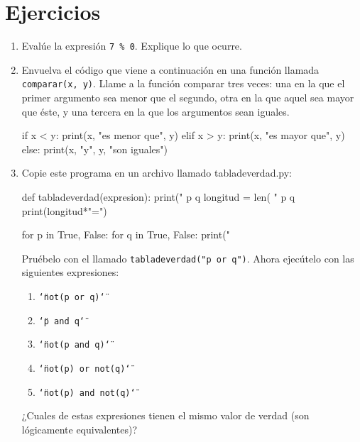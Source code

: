 \section{Ejercicios}
\begin{enumerate}
\item Evalúe la expresión \verb+7 % 0+. Explique lo que ocurre.
\item Envuelva el código que viene a continuación en una función llamada
\verb+comparar(x, y)+. Llame a la función comparar tres veces: una
en la que el primer argumento sea menor que el segundo, otra en la
que aquel sea mayor que éste, y una tercera en la que los argumentos
sean iguales. 
\begin{pythoncode}
 if x < y:
    print(x, "es menor que", y)
 elif x > y:
    print(x, "es mayor que", y)
 else:
    print(x, "y", y, "son iguales")
\end{pythoncode}
\item Copie este programa en un archivo llamado tabladeverdad.py: 
\begin{pythoncode}
def tabladeverdad(expresion):
    print(" p      q      %
    longitud = len( " p      q      %
    print(longitud*"=")

    for p in True, False:
        for q in True, False:
            print("%
\end{pythoncode}

Pruébelo con el llamado \verb+tabladeverdad("p or q")+. Ahora ejecútelo
con las siguientes expresiones: 
\begin{enumerate}
\item \texttt{\char`\"{}not(p or q)\char`\"{}} 
\item \texttt{\char`\"{}p and q\char`\"{}} 
\item \texttt{\char`\"{}not(p and q)\char`\"{}} 
\item \texttt{\char`\"{}not(p) or not(q)\char`\"{}} 
\item \texttt{\char`\"{}not(p) and not(q)\char`\"{} }
\end{enumerate}
¿Cuales de estas expresiones tienen el mismo valor de verdad (son
lógicamente equivalentes)?
\end{enumerate}